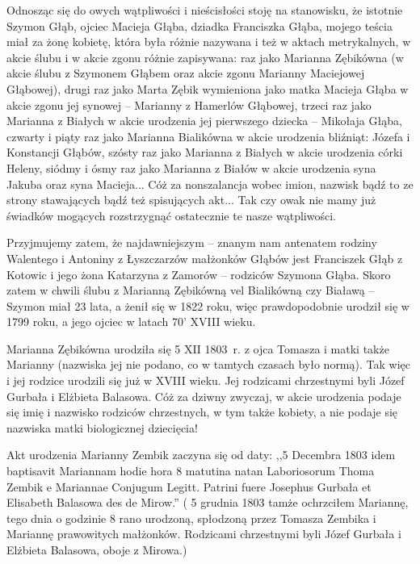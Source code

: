 Odnosząc się do owych wątpliwości i nieścisłości stoję na stanowisku, że istotnie Szymon Głąb, ojciec Macieja Głąba, dziadka Franciszka Głąba, mojego teścia miał za żonę kobietę, która była różnie nazywana i też w  aktach metrykalnych, w akcie ślubu i w akcie zgonu różnie zapisywana: raz jako Marianna Zębikówna (w akcie ślubu z Szymonem Głąbem oraz akcie zgonu Marianny Maciejowej Głąbowej), drugi raz jako Marta Zębik wymieniona jako matka Macieja Głąba w akcie zgonu jej synowej – Marianny z Hamerlów Głąbowej, trzeci raz jako Marianna z Białych w akcie urodzenia jej pierwszego dziecka – Mikołaja Głąba, czwarty i piąty raz jako Marianna Bialikówna w akcie urodzenia bliźniąt: Józefa i Konstancji Głąbów, szósty raz jako Marianna z Białych w akcie urodzenia córki Heleny, siódmy i ósmy raz jako Marianna z Białów w akcie urodzenia syna Jakuba oraz syna Macieja... Cóż za nonszalancja wobec imion, nazwisk bądź to ze strony stawających bądź też spisujących akt... Tak czy owak nie mamy już świadków mogących rozstrzygnąć ostatecznie te nasze wątpliwości.

Przyjmujemy zatem, że najdawniejszym -- znanym nam antenatem rodziny Walentego i Antoniny z Łyszczarzów małżonków Głąbów jest Franciszek Głąb z Kotowic i jego żona Katarzyna z Zamorów -- rodziców Szymona Głąba. Skoro zatem w chwili ślubu z Marianną Zębikówną vel Bialikówną czy Białawą -- Szymon miał 23 lata, a żenił się w 1822 roku, więc prawdopodobnie urodził się w 1799 roku, a jego ojciec w latach 70’ XVIII wieku.


Marianna Zębikówna urodziła się 5 XII 1803~r. z ojca Tomasza i matki także Marianny (nazwiska jej nie podano, co w tamtych czasach było normą). Tak więc i jej rodzice urodzili się już w XVIII wieku. Jej rodzicami chrzestnymi byli Józef Gurbała i Elżbieta Balasowa. Cóż za dziwny zwyczaj, w akcie urodzenia podaje się imię i nazwisko rodziców chrzestnych, w tym także kobiety, a nie podaje się nazwiska matki biologicznej dziecięcia!

Akt urodzenia Marianny Zembik zaczyna się od daty: ,,5 Decembra 1803 idem baptisavit Mariannam hodie hora 8 matutina natan Laboriosorum Thoma Zembik e Mariannae Conjugum Legitt. Patrini fuere Josephus Gurbała et Elisabeth Balasowa des de Mirow.'' ( 5 grudnia 1803 tamże ochrzciłem Mariannę, tego dnia o godzinie 8 rano urodzoną, spłodzoną przez Tomasza Zembika i Mariannę prawowitych małżonków. Rodzicami chrzestnymi byli Józef Gurbała i Elżbieta Balasowa, oboje z Mirowa.)

